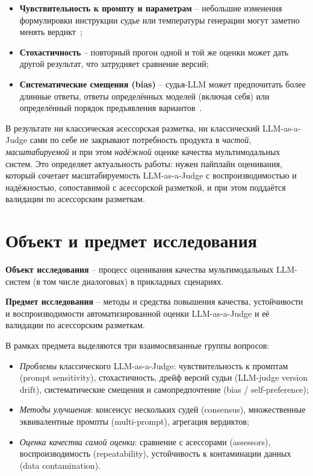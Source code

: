 \begin{itemize}
    \item \textbf{Чувствительность к промпту и параметрам} -- небольшие
        изменения формулировки инструкции судье или температуры
        генерации могут заметно менять вердикт~\cite{razavi2025benchmarking,
        arabzadeh2025humanai};
    \item \textbf{Стохастичность} -- повторный прогон одной и той же
        оценки может дать другой результат, что затрудняет сравнение
        версий;
    \item \textbf{Систематические смещения (bias)} -- судья-LLM может
        предпочитать более длинные ответы, ответы определённых моделей
        (включая себя) или определённый порядок предъявления
        вариантов~\cite{ye2024justice, wataoka2024selfpreference}.
\end{itemize}

В результате ни классическая асессорская разметка, ни классический
LLM-as-a-Judge сами по себе не закрывают потребность продукта в
\emph{частой}, \emph{масштабируемой} и при этом \emph{надёжной} оценке
качества мультимодальных систем.
Это определяет актуальность работы: нужен пайплайн оценивания, который
сочетает масштабируемость LLM-as-a-Judge с воспроизводимостью и
надёжностью, сопоставимой с асессорской разметкой, и при этом
поддаётся валидации по асессорским разметкам.

\section{Объект и предмет исследования}
\label{sec:intro:object}

\textbf{Объект исследования} -- процесс оценивания качества
мультимодальных LLM-систем (в том числе диалоговых) в прикладных
сценариях.

\textbf{Предмет исследования} -- методы и средства повышения качества,
устойчивости и воспроизводимости автоматизированной оценки
LLM-as-a-Judge и её валидации по асессорским разметкам.

В рамках предмета выделяются три взаимосвязанные группы вопросов:

\begin{itemize}
    \item \emph{Проблемы} классического LLM-as-a-Judge: чувствительность
        к промптам (prompt sensitivity), стохастичность, дрейф версий
        судьи (LLM-judge version drift), систематические смещения и
        самопредпочтение (bias / self-preference);
    \item \emph{Методы улучшения}: консенсус нескольких судей
        (consensus), множественные эквивалентные промпты (multi-prompt),
        агрегация вердиктов;
    \item \emph{Оценка качества самой оценки}: сравнение с асессорами
        (assessors), воспроизводимость (repeatability), устойчивость к
        контаминации данных (data contamination).
\end{itemize}

